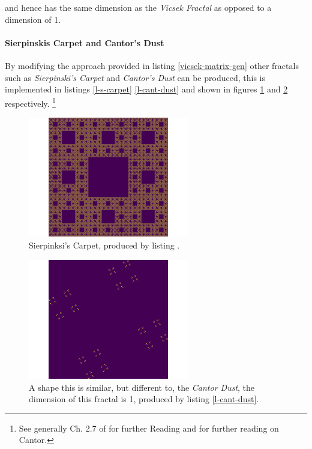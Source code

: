 \documentclass[a4paper,11pt,twoside]{article}
\begin{document}
and hence has the same dimension as the \emph{Vicsek Fractal} as opposed to a
dimension of 1.

\paragraph{Sierpinskis Carpet and Cantor's Dust}
\label{sec:orgb40c3d4}
By modifying the approach provided in listing \ref{vicsek-matrix-gen} other fractals
such as \emph{Sierpinski's Carpet} and \emph{Cantor's Dust} can be produced, this is
implemented in listings \ref{l-s-carpet} \ref{l-cant-dust} and shown in figures
\ref{fig:square-carpet} and \ref{fig:cantor-dust} respectively. \footnote{See generally Ch. 2.7 of \cite[\S 2.7]{peitgenChaosFractalsNew2004} for further Reading and \cite[p. 79]{mandelbrotFractalGeometryNature1982} for further reading on Cantor.}

\begin{figure}[htbp]
\centering
\includegraphics[width=7cm]{media/sierpinsky_carpet.png}
\caption{\label{fig:square-carpet}Sierpinksi's Carpet, produced by listing .}
\end{figure}


\begin{figure}[htbp]
\centering
\includegraphics[width=7cm]{media/Cantor_Dust_gen.png}
\caption{\label{fig:cantor-dust}A shape this is similar, but different to, the \emph{Cantor Dust}, the dimension of this fractal is 1, produced by listing \ref{l-cant-dust}.}
\end{figure}
\end{document}
